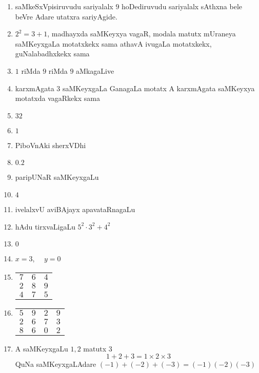 \begin{enumerate}
\item saMkeSxVpisiruvudu sariyalalx $9$ hoDediruvudu sariyalalx sAthxna bele beVre Adare utatxra sariyAgide. 

\item $2^2 =3+1$, madhayxda saMKeyxya vagaR, modala matutx mUraneya saMKeyxgaLa motatxkekx sama athavA ivugaLa motatxkekx, guNalabadhxkekx sama

\item $1$ riMda $9$ riMda $9$ aMkagaLive

\item karxmAgata $3$ saMKeyxgaLa GanagaLa motatx A karxmAgata saMKeyxya motatxda vagaRkekx sama

\item $32$
  
\item $1$

\item PiboVnAki sherxVDhi

\item $0.2$

\item paripUNaR saMKeyxgaLu

\item $4$

\item ivelalxvU aviBAjayx apavataRnagaLu

\item hAdu tirxvaLigaLu $5^2 \cdot 3^2+4^2$

\item $0$

\item $x =3$, ~~$y=0$

\item
  \begin{tabular}[t]{ccc}
    $7$&$6$&$4$\\
    $2$&$8$&$9$\\\cline{1-3}
    $4$&$7$&$5$
  \end{tabular}
  
\item
  \begin{tabular}[t]{cccc}
    $5$&$9$&$2$&$9$\\
    $2$&$6$&$7$&$3$\\\cline{1-4}
    $8$&$6$&$0$&$2$
  \end{tabular}

\item A saMKeyxgaLu $1, 2$ matutx $3$
  $$
1+2+3= 1\times 2 \times 3
$$
QuNa saMKeyxgaLAdare $(-1) + (-2) + (-3) = (-1) (-2) (-3)$


\end{enumerate}
